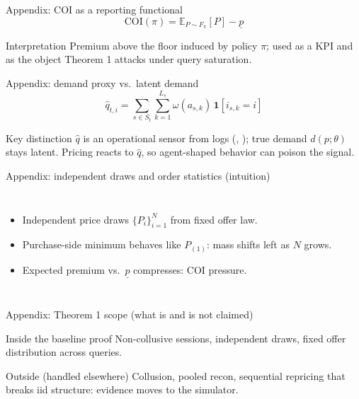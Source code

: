\begin{frame}{Appendix: COI as a reporting functional}
  \[
    \mathrm{COI}(\pi) = \mathbb{E}_{P\sim F_\pi}[P] - \underline{p}
  \]
  \begin{block}{Interpretation}
    Premium above the floor induced by policy \(\pi\); used as a KPI and as the object Theorem 1 attacks under query saturation.
  \end{block}
\end{frame}

\begin{frame}{Appendix: demand proxy vs.\ latent demand}
  \[
    \hat{q}_{t,i}=\sum_{s\in S_t}\sum_{k=1}^{L_s} \omega(a_{s,k})\,\mathbf{1}[i_{s,k}=i]
  \]
  \begin{alertblock}{Key distinction}
    \(\hat{q}\) is an operational sensor from logs (\humanicon, \roboticon); true demand \(d(p;\theta)\) stays latent. Pricing reacts to \(\hat{q}\), so agent-shaped behavior can poison the signal.
  \end{alertblock}
\end{frame}


\begin{frame}{Appendix: independent draws and order statistics (intuition)}
  \begin{columns}[T]
    \begin{itemize}
      \item Independent price draws \(\{P_i\}_{i=1}^N\) from fixed offer law.
      \item Purchase-side minimum behaves like \(P_{(1)}\): mass shifts left as \(N\) grows.
      \item Expected premium vs.\ \(\underline{p}\) compresses: COI pressure.
    \end{itemize}
    \centering
  \end{columns}
\end{frame}

\begin{frame}{Appendix: Theorem 1 scope (what is and is not claimed)}
  \small
  \begin{block}{Inside the baseline proof}
    Non-collusive sessions, independent draws, fixed offer distribution across queries.
  \end{block}
  \begin{alertblock}{Outside (handled elsewhere)}
    Collusion, pooled recon, sequential repricing that breaks iid structure: evidence moves to the simulator.
  \end{alertblock}
\end{frame}

